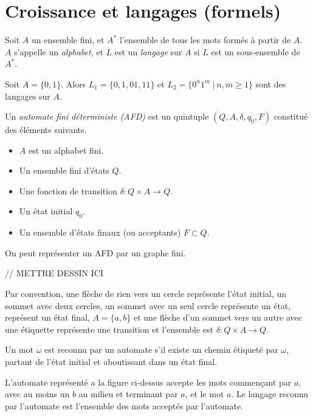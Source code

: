 
\chapter{Croissance et langages (formels)}
\label{cha:croiss-et-lang-form}

  \begin{defi}
    Soit $A$ un ensemble fini, et $A^\ast$ l'ensemble de tous les mots formés à partir de $A$. $A$ s'appelle
    un \emph{alphabet},  et $L$ est un \emph{langage}  sur $A$ si $L$ est un
    sous-ensemble de $A^\ast$.
  \end{defi}

  \begin{ex}
    Soit $A = \{0, 1\}$. Alors $L_1 = \{0, 1, 01, 11\}$ et $L_2 = \{0^n1^m\ |\ n, m \geq 1\}$ sont des
    langages sur $A$.
  \end{ex}


  \begin{defi}
    Un \emph{automate fini déterministe (AFD)}  est un quintuple $(Q, A,
    \delta, q_0, F)$ constitué des éléments suivants.
    \begin{itemize}
    \item $A$ est un alphabet fini.
    \item Un ensemble fini d'états $Q$.
    \item Une fonction de transition $\delta: Q \times A \to Q$.
    \item Un état initial $q_0$.
    \item Un ensemble d'états finaux (ou acceptants) $F \subset Q$.
    \end{itemize}
  \end{defi}

  \begin{ex}
    On peut représenter un AFD par un graphe fini.
    
    // METTRE DESSIN ICI

    Par convention, une flèche de rien vers un cercle représente l'état initial, un sommet avec deux cercles,
    un sommet avec un seul cercle représente un état,
    représent un état final, $A = \{a, b\}$ et une flèche d'un sommet vers un autre avec une étiquette
    représente une transition et l'ensemble est $\delta: Q \times A \to Q$.

    Un mot $\omega$ est reconnu par un automate s'il existe un chemin étiqueté par $\omega$, partant de l'état
    initial et aboutissant dans un état final.

    L'automate représenté a la figure ci-dessus accepte les mots commençant par $a$, avec au moins un $b$ au
    milieu et terminant par $a$, et le mot $a$. Le langage reconnu par l'automate est l'ensemble des mots
    acceptés par l'automate.
  \end{ex}


